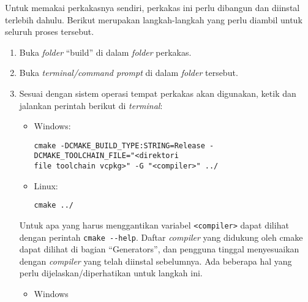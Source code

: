 Untuk memakai perkakasnya sendiri, perkakas ini perlu dibangun dan diinstal terlebih dahulu. Berikut merupakan langkah-langkah yang perlu diambil untuk seluruh proses tersebut.

\begin{enumerate}
	\item Buka \textit{folder} ``build'' di dalam \textit{folder} perkakas.
	\item Buka \textit{terminal/command prompt} di dalam \textit{folder} tersebut.
	\item Sesuai dengan sistem operasi tempat perkakas akan digunakan, ketik dan jalankan perintah berikut di \textit{terminal}:
	
	\begin{itemize}
		\item Windows:
		\begin{verbatim}
cmake -DCMAKE_BUILD_TYPE:STRING=Release -DCMAKE_TOOLCHAIN_FILE="<direktori
file toolchain vcpkg>" -G "<compiler>" ../
		\end{verbatim}
	
		\item Linux:
		\begin{verbatim}
cmake ../
		\end{verbatim}
	\end{itemize}		

	Untuk apa yang harus menggantikan variabel \verb|<compiler>| dapat dilihat dengan \mbox{perintah} \verb|cmake --help|. Daftar \textit{compiler} yang didukung oleh cmake dapat dilihat di bagian \linebreak ``Generators'', dan pengguna tinggal menyesuaikan dengan \textit{compiler} yang telah diinstal sebelumnya.  Ada beberapa hal yang perlu dijelaskan/diperhatikan untuk langkah ini.
	
	\begin{itemize}
		\item Windows
			

\end{itemize}
\end{enumerate}
